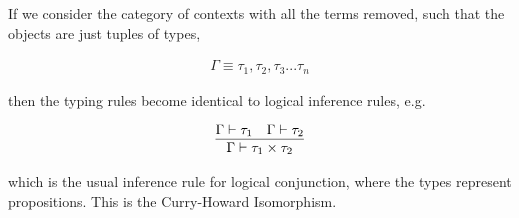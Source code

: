 If we consider the category of contexts with all the terms removed, such that the objects are just tuples of types,

\begin{align*}
    \Gamma \equiv \tau_1,\tau_2,\tau_3...\tau_n
\end{align*}

then the typing rules become identical to logical inference rules, e.g.

\begin{align*}
    \infer{\Gamma\vdash \tau_1 \times \tau_2}
    {\Gamma\vdash\tau_1 & \Gamma\vdash\tau_2}
\end{align*}

which is the usual inference rule for logical conjunction, where the types
represent propositions. This is the Curry-Howard Isomorphism.